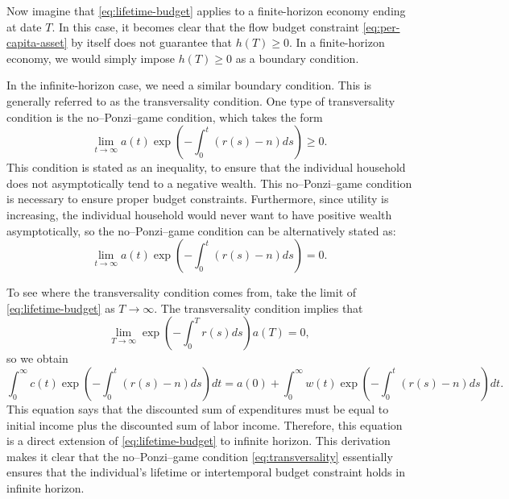 \documentclass[\topdir/lecture\_notes.tex]{subfiles}
\begin{document}
Now imagine that \eqref{eq:lifetime-budget} applies to a finite-horizon economy ending at date $T$.
In this case, it becomes clear that the flow budget constraint \eqref{eq:per-capita-asset} by itself does not guarantee that $h(T) \geq 0$.
In a finite-horizon economy, we would simply impose $h(T) \geq 0$ as a boundary condition.

In the infinite-horizon case, we need a similar boundary condition.
This is generally referred to as the transversality condition.
One type of transversality condition is the no--Ponzi--game condition, which takes the form
\begin{equation}
  \lim _{t \rightarrow \infty} a(t) \exp \left(-\int_{0}^{t}(r(s)-n) ds\right) \geq 0.
  \label{eq:no-ponzi}
\end{equation}
This condition is stated as an inequality, to ensure that the individual household does not asymptotically tend to a negative wealth.
This no--Ponzi--game condition is necessary to ensure proper budget constraints.
Furthermore, since utility is increasing, the individual household would never want to have positive wealth asymptotically, so the no--Ponzi--game condition can be alternatively stated as:
\begin{equation}
  \lim _{t \rightarrow \infty} a(t) \exp \left(-\int_{0}^{t}(r(s)-n) ds\right)=0.
  \label{eq:transversality}
\end{equation}

To see where the transversality condition comes from, take the limit of \eqref{eq:lifetime-budget} as $T \rightarrow \infty$. The transversality condition implies that
\[
  \lim_{T\to\infty}\exp \left(-\int_{0}^{T} r(s) ds\right) a(T) =0,
\]
so we obtain
\[
  \int_{0}^{\infty} c(t) \exp \left(-\int_{0}^{t}(r(s)-n) ds\right) dt=a(0)+\int_{0}^{\infty} w(t) \exp \left(-\int_{0}^{t}(r(s)-n) ds\right) dt.
\]
This equation says that the discounted sum of expenditures must be equal to initial income plus the discounted sum of labor income.
Therefore, this equation is a direct extension of \eqref{eq:lifetime-budget} to infinite horizon.
This derivation makes it clear that the no--Ponzi--game condition \eqref{eq:transversality} essentially ensures that the individual's lifetime or intertemporal budget constraint holds in infinite horizon.
\end{document}
